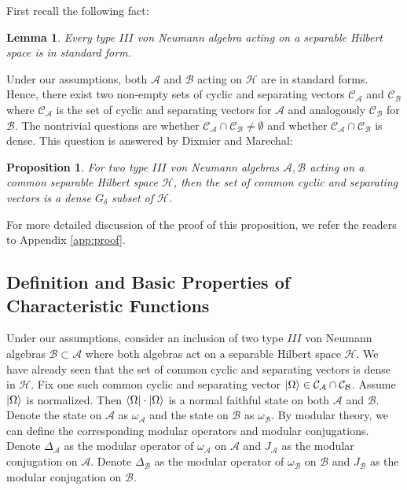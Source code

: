 \documentclass[a4paper,11pt]{article}
\newtheorem{lemma}[theorem]{Lemma}
\newtheorem{proposition}[theorem]{Proposition}
\theoremstyle{definition}
\begin{document}
First recall the following fact\cite{blackadar}:
\begin{lemma}\label{lemma:blackadar}
    Every type $III$ von Neumann algebra acting on a separable Hilbert space is in standard form.
\end{lemma}
Under our assumptions, both $\mathcal{A}$ and $\mathcal{B}$ acting on $\mathcal{H}$ are in standard forms. Hence, there exist two non-empty sets of cyclic and separating vectors $\mathcal{C}_\mathcal{A}$ and $\mathcal{C}_\mathcal{B}$ where $\mathcal{C}_\mathcal{A}$ is the set of cyclic and separating vectors for $\mathcal{A}$ and analogously $\mathcal{C}_\mathcal{B}$ for $\mathcal{B}$. The nontrivial questions are whether $\mathcal{C}_\mathcal{A}\cap\mathcal{C}_\mathcal{B} \neq\emptyset$ and whether $\mathcal{C}_\mathcal{A}\cap\mathcal{C}_\mathcal{B}$ is dense. This question is answered by Dixmier and Marechal\cite{dixmiermarechal}:
\begin{proposition}\label{prop:density}
    For two type $III$ von Neumann algebras $\mathcal{A}, \mathcal{B}$ acting on a common separable Hilbert space $\mathcal{H}$, then the set of common cyclic and separating vectors is a dense $G_\delta$ subset of $\mathcal{H}$.
\end{proposition}
For more detailed discussion of the proof of this proposition, we refer the readers to Appendix \ref{app:proof}.
\subsection{Definition and Basic Properties of Characteristic Functions}
Under our assumptions, consider an inclusion of two type $III$ von Neumann algebras $\mathcal{B}\subset \mathcal{A}$ where both algebras act on a separable Hilbert space $\mathcal{H}$. We have already seen that the set of common cyclic and separating vectors is dense in $\mathcal{H}$. Fix one such common cyclic and separating vector $\ket{\Omega}\in\mathcal{C}_\mathcal{A}\cap\mathcal{C}_\mathcal{B}$. Assume $\ket{\Omega}$ is normalized. Then $\bra{\Omega}\cdot\ket{\Omega}$ is a normal faithful state on both $\mathcal{A}$ and $\mathcal{B}$. Denote the state on $\mathcal{A}$ as $\omega_\mathcal{A}$ and the state on $\mathcal{B}$ as $\omega_\mathcal{B}$. By modular theory, we can define the corresponding modular operators and modular conjugations. Denote $\Delta_\mathcal{A}$ as the modular operator of $\omega_\mathcal{A}$ on $\mathcal{A}$ and $J_\mathcal{A}$ as the modular conjugation on $\mathcal{A}$. Denote $\Delta_\mathcal{B}$ as the modular operator of $\omega_\mathcal{B}$ on $\mathcal{B}$ and $J_\mathcal{B}$ as the modular conjugation on $\mathcal{B}$.
\end{document}
